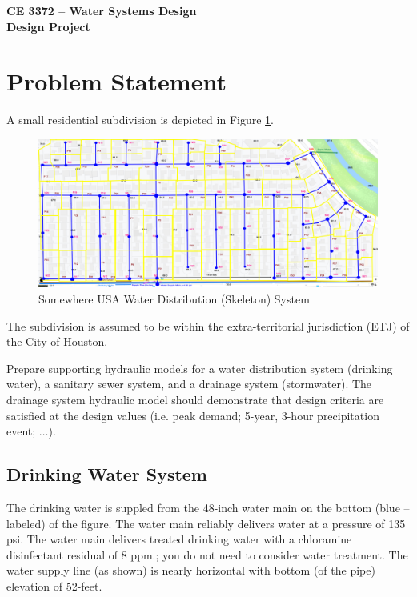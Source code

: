 \documentclass[12pt]{article}
\begin{document}
\begin{center}
{\textbf{{ CE 3372 -- Water Systems Design} \\ {Design Project}}}
\end{center}

\tableofcontents
\newpage

\section{\small{Problem Statement}}
A small residential subdivision is depicted in Figure \ref{fig:StudyAreaWithContours}.    

\begin{figure}[h!] %
   \centering
   \includegraphics[width=6in]{SomewhereClipNodes.png} 
   \caption{Somewhere USA Water Distribution (Skeleton) System}
   \label{fig:StudyAreaWithContours}
\end{figure}

The subdivision is assumed to be within the extra-territorial jurisdiction (ETJ) of the City of Houston.  

Prepare supporting hydraulic models for a water distribution system (drinking water), a sanitary sewer system, and a drainage system (stormwater).
The drainage system hydraulic model should demonstrate that design criteria are satisfied at the design values (i.e. peak demand; 5-year, 3-hour precipitation event;  $\dots$).

\subsection{\small{Drinking Water System}}
The drinking water is suppled from the 48-inch water main on the bottom (blue -- labeled)  of the figure.  
The water main reliably delivers water at a pressure of 135 psi. 
The water main delivers treated drinking water with a chloramine disinfectant residual of 8 ppm.;  you do not need to consider water treatment.
The water supply line (as shown) is nearly horizontal with bottom (of the pipe) elevation of 52-feet.
\end{document}
